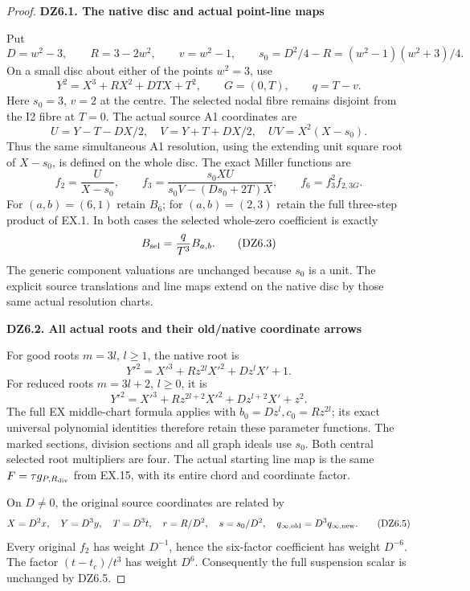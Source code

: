 \begin{proof}
\par

\medskip\noindent\textbf{DZ6.1. The native disc and actual point-line maps}

\par\nobreak

Put
\[
 D=w^2-3,\qquad R=3-2w^2,\qquad v=w^2-1,\qquad
 s_0=D^2/4-R=(w^2-1)(w^2+3)/4.
\]
On a small disc about either of the points \(w^2=3\), use
\[
 Y^2=X^3+R X^2+DTX+T^2,\qquad G=(0,T),\qquad q=T-v.
 \tag{DZ6.1}
\]
Here \(s_0=3\), \(v=2\) at the centre. The selected nodal
fibre remains disjoint from the I2 fibre at \(T=0\). The
actual source A1 coordinates are
\[
 U=Y-T-DX/2,\quad V=Y+T+DX/2,\quad UV=X^2(X-s_0).
\]
Thus the same simultaneous A1 resolution, using the extending
unit square root of \(X-s_0\), is defined on the whole disc.
The exact Miller functions are
\[
 f_2=\frac{U}{X-s_0},\qquad
 f_3=\frac{s_0 XU}{s_0V-(Ds_0+2T)X},\qquad
 f_6=f_3^2 f_{2,3G}.
 \tag{DZ6.2}
\]
For \((a,b)=(6,1)\) retain \(B_6\); for \((a,b)=(2,3)\)
retain the full three-step product of EX.1. In both cases the
selected whole-zero coefficient is exactly
\[
                         B_{\rm sel}=\frac{q}{T^3}B_{a,b}.
 \tag{DZ6.3}
\]
The generic component valuations are unchanged because \(s_0\)
is a unit. The explicit source translations and line maps extend
on the native disc by those same actual resolution charts.

\par

\medskip\noindent\textbf{DZ6.2. All actual roots and their old/native coordinate arrows}

\par\nobreak

For good roots \(m=3l\), \(l\ge1\), the native root is
\[
 Y'^2=X'^3+Rz^{2l}X'^2+Dz^lX'+1.
\]
For reduced roots \(m=3l+2\), \(l\ge0\), it is
\[
 Y'^2=X'^3+Rz^{2l+2}X'^2+Dz^{l+2}X'+z^2.
 \tag{DZ6.4}
\]
The full EX middle-chart formula applies with
\(b_0=Dz^l,c_0=Rz^{2l}\); its exact universal polynomial
identities therefore retain these parameter functions. The marked
sections, division sections and all graph ideals use \(s_0\).
Both central selected root multipliers are four. The actual
starting line map is the same \(F=\tau g_{P,R_{\rm div}}\)
from EX.15, with its entire chord and coordinate factor.

On \(D\ne0\), the original source coordinates are related by
\[
 X=D^2x,\quad Y=D^3y,\quad T=D^3t,\quad
 r=R/D^2,\quad s=s_0/D^2,\quad q_{\infty,\rm old}
       =D^3q_{\infty,\rm new}.
 \tag{DZ6.5}
\]
Every original \(f_2\) has weight \(D^{-1}\), hence the
six-factor coefficient has weight \(D^{-6}\). The factor
\((t-t_c)/t^3\) has weight \(D^6\). Consequently the full
suspension scalar is unchanged by DZ6.5.


\end{proof}
